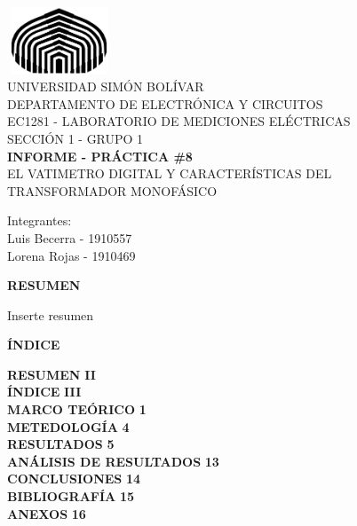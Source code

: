 \documentclass[12pt]{article}
\begin{document}
	
	\thispagestyle{empty}
	
	\begin{center}
		\includegraphics[width=3.1cm,height=2cm]{logo}\\
		UNIVERSIDAD SIMÓN BOLÍVAR\\
		DEPARTAMENTO DE ELECTRÓNICA Y CIRCUITOS\\
		EC1281 - LABORATORIO DE MEDICIONES ELÉCTRICAS\\
		SECCIÓN 1 - GRUPO 1\\
		
		\vspace{6cm}
		\textbf{\Large INFORME - PRÁCTICA \#8}\\
		EL VATIMETRO DIGITAL Y CARACTERÍSTICAS DEL TRANSFORMADOR MONOFÁSICO\\
	\end{center}
	
	\begin{flushleft}
		\vspace{9cm}
		\hfill Integrantes:\\
		\hfill {\large Luis Becerra - 1910557}\\
		\hfill {\large Lorena Rojas - 1910469}\\
	\end{flushleft}
	
	\newpage
	
        \setcounter{page}{2}
	
	\begin{center}
		\textbf{\large RESUMEN}\\
	\end{center}
	
	Inserte resumen
	
	\newpage
	
	\begin{center}
		\textbf{\large ÍNDICE}\\
	\end{center}
	
	\noindent \textbf{RESUMEN} \hfill \textbf{II}\\
	\noindent \textbf{ÍNDICE} \hfill \textbf{III}\\
	\noindent \textbf{MARCO TEÓRICO} \hfill \textbf{1}\\
	\noindent \textbf{METEDOLOGÍA} \hfill \textbf{4}\\
	\noindent \textbf{RESULTADOS} \hfill \textbf{5}\\
	\noindent \textbf{ANÁLISIS DE RESULTADOS} \hfill \textbf{13}\\
	\noindent \textbf{CONCLUSIONES} \hfill \textbf{14}\\
	\noindent \textbf{BIBLIOGRAFÍA} \hfill \textbf{15}\\
	\noindent \textbf{ANEXOS} \hfill \textbf{16}\\
	
\end{document}
